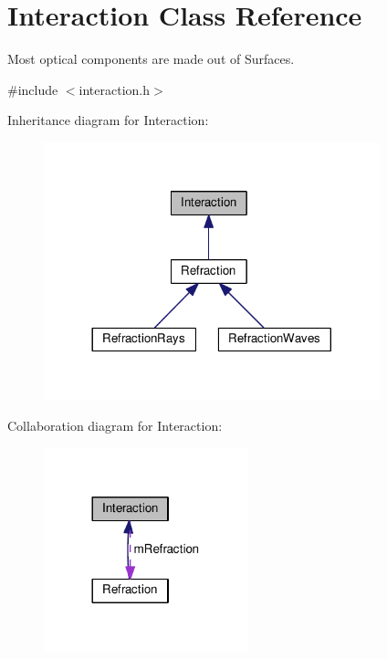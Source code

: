 \hypertarget{classInteraction}{}\section{Interaction Class Reference}
\label{classInteraction}


Most optical components are made out of Surfaces.  




{\ttfamily \#include $<$interaction.\+h$>$}



Inheritance diagram for Interaction\+:\nopagebreak
\begin{figure}[H]
\begin{center}
\leavevmode
\includegraphics[width=276pt]{classInteraction__inherit__graph}
\end{center}
\end{figure}


Collaboration diagram for Interaction\+:\nopagebreak
\begin{figure}[H]
\begin{center}
\leavevmode
\includegraphics[width=168pt]{classInteraction__coll__graph}
\end{center}
\end{figure}
